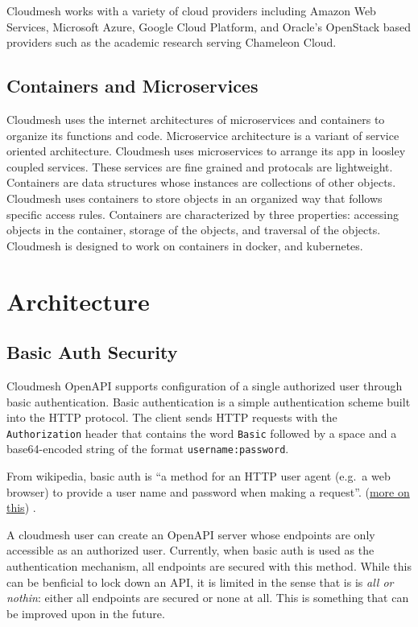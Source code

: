 Cloudmesh works with a variety of cloud providers including Amazon Web
Services, Microsoft Azure, Google Cloud Platform, and Oracle's OpenStack
based providers such as the academic research serving Chameleon Cloud.

\subsection{Containers and
Microservices}\label{containers-and-microservices}

Cloudmesh uses the internet architectures of microservices and
containers to organize its functions and code. Microservice architecture
is a variant of service oriented architecture. Cloudmesh uses
microservices to arrange its app in loosley coupled services. These
services are fine grained and protocals are lightweight. Containers are
data structures whose instances are collections of other objects.
Cloudmesh uses containers to store objects in an organized way that
follows specific access rules. Containers are characterized by three
properties: accessing objects in the container, storage of the objects,
and traversal of the objects. Cloudmesh is designed to work on
containers in docker, and kubernetes.

\section{Architecture}\label{architecture}

\subsection{Basic Auth Security}\label{basic-auth-security}

Cloudmesh OpenAPI supports configuration of a single authorized user
through basic authentication. Basic authentication is a simple
authentication scheme built into the HTTP protocol. The client sends
HTTP requests with the \texttt{Authorization} header that contains the
word \texttt{Basic} followed by a space and a base64-encoded string of
the format \texttt{username:password}.

From wikipedia, basic auth is ``a method for an HTTP user agent (e.g.~a
web browser) to provide a user name and password when making a
request''. (\href{https://github.com/cloudmesh/cloudmesh-openapi}{more
on this}) \cite{cloudmesh-openapi}.

A cloudmesh user can create an OpenAPI server whose endpoints are only
accessible as an authorized user. Currently, when basic auth is used as
the authentication mechanism, all endpoints are secured with this
method. While this can be benficial to lock down an API, it is limited
in the sense that is is {\em all or nothin}: either all endpoints are
secured or none at all. This is something that can be improved upon in
the future.

